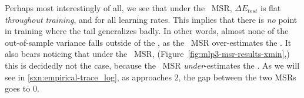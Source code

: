 Perhaps most interestingly of all, we see that under the \TRACELOG~MSR, $\Delta E_{test}$ is flat \emph{throughout 
training}, and for all learning rates. This implies that there is \emph{no} point in training where the 
\TRACELOG tail generalizes badly. In other words, almost none of the out-of-sample variance falls outside of the \EffectiveCorrelationSpace, as the \TRACELOG~MSR over-estimates the \EffectiveCorrelationSpace. It also bears noticing that under the 
\POWERLAW~MSR, (Figure~\ref{fig:mlp3-msr-results-xmin},) this is decidedly not the case, because the \POWERLAW~MSR \emph{under}-estimates the \EffectiveCorrelationSpace. As we will see in \ref{sxn:empirical-trace_log}, as \ALPHA approaches $2$, the gap between the two MSRs goes to $0$.


